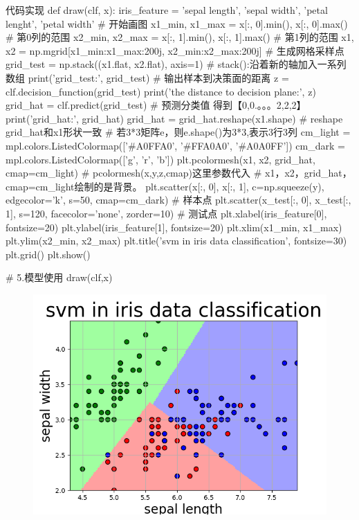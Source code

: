 \documentclass[openbib]{article}
\begin{document}
\begin{Python}{代码实现}
def draw(clf, x):
	iris_feature = 'sepal length', 'sepal width', 'petal lenght', 'petal width'
	# 开始画图
	x1_min, x1_max = x[:, 0].min(), x[:, 0].max()  # 第0列的范围
	x2_min, x2_max = x[:, 1].min(), x[:, 1].max()  # 第1列的范围
	x1, x2 = np.mgrid[x1_min:x1_max:200j, x2_min:x2_max:200j]  # 生成网格采样点
	grid_test = np.stack((x1.flat, x2.flat), axis=1)  # stack():沿着新的轴加入一系列数组
	print('grid_test:\n', grid_test)
	# 输出样本到决策面的距离
	z = clf.decision_function(grid_test)
	print('the distance to decision plane:\n', z)
	grid_hat = clf.predict(grid_test)  # 预测分类值 得到【0,0.。。。2,2,2】
	print('grid_hat:\n', grid_hat)
	grid_hat = grid_hat.reshape(x1.shape)  # reshape grid_hat和x1形状一致
	# 若3*3矩阵e，则e.shape()为3*3,表示3行3列
	cm_light = mpl.colors.ListedColormap(['#A0FFA0', '#FFA0A0', '#A0A0FF'])
	cm_dark = mpl.colors.ListedColormap(['g', 'r', 'b'])
	plt.pcolormesh(x1, x2, grid_hat, cmap=cm_light)  # pcolormesh(x,y,z,cmap)这里参数代入
	# x1，x2，grid_hat，cmap=cm_light绘制的是背景。
	plt.scatter(x[:, 0], x[:, 1], c=np.squeeze(y), edgecolor='k', s=50, cmap=cm_dark)  # 样本点
	plt.scatter(x_test[:, 0], x_test[:, 1], s=120, facecolor='none', zorder=10)  # 测试点
	plt.xlabel(iris_feature[0], fontsize=20)
	plt.ylabel(iris_feature[1], fontsize=20)
	plt.xlim(x1_min, x1_max)
	plt.ylim(x2_min, x2_max)
	plt.title('svm in iris data classification', fontsize=30)
	plt.grid()
	plt.show()

# 5.模型使用
draw(clf,x)
\end{Python}
\begin{figure}[htbp]
	\centering
	\includegraphics[scale=0.38]{Figure_1}
\end{figure}
\end{document}
